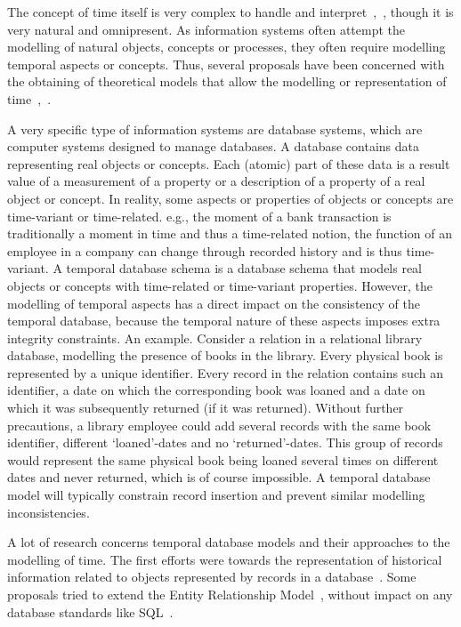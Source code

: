 %
%

The concept of time itself is very complex to handle and interpret~\cite{Klein1994},~\cite{Shackle1961}, though it is very natural and omnipresent. As information systems often attempt the modelling of natural objects, concepts or processes, they often require modelling temporal aspects or concepts. Thus, several proposals have been concerned with the obtaining of theoretical models that allow the modelling or representation of time~\cite{Bolour1982},~\cite{VanderCruyssen1997}.

A very specific type of information systems are database systems, which are computer systems designed to manage databases. A database contains data representing real objects or concepts. Each (atomic) part of these data is a result value of a measurement of a property or a description of a property of a real object or concept. In reality, some aspects or properties of objects or concepts are time-variant or time-related. e.g., the moment of a bank transaction is traditionally a moment in time and thus a time-related notion, the function of an employee in a company can change through recorded history and is thus time-variant. A temporal database schema is a database schema that models real objects or concepts with time-related or time-variant properties. However, the modelling of temporal aspects has a direct impact on the consistency of the temporal database, because the temporal nature of these aspects imposes extra integrity constraints. An example. Consider a relation in a relational library database, modelling the presence of books in the library. Every physical book is represented by a unique identifier. Every record in the relation contains such an identifier, a date on which the corresponding book was loaned and a date on which it was subsequently returned (if it was returned). Without further precautions, a library employee could add several records with the same book identifier, different `loaned'-dates and no `returned'-dates. This group of records would represent the same physical book being loaned several times on different dates and never returned, which is of course impossible. A temporal database model will typically constrain record insertion and prevent similar modelling inconsistencies.

A lot of research concerns temporal database models and their approaches to the modelling of time. The first efforts were towards the representation of historical information related to objects represented by records in a database~\cite{Clifford1985}. Some proposals tried to extend the Entity Relationship Model~\cite{Klopprogge1983}, without impact on any database standards like SQL~\cite{Sarda1990}.

